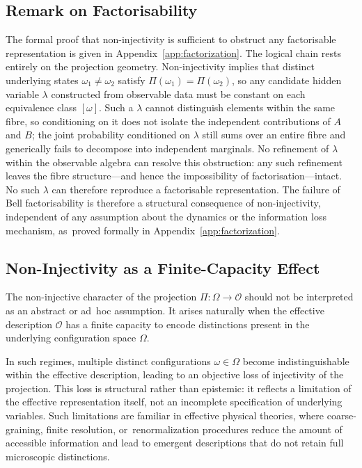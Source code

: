 \documentclass[quantumrep,article,accept,pdftex,oneauthor]{Definitions/mdpi}
\theoremstyle{remark}
\begin{document}
    \subsection{Remark on Factorisability}
      The formal proof that non-injectivity is sufficient to obstruct any
      factorisable representation is given in Appendix~\ref{app:factorization}.
      The logical chain rests entirely on the projection geometry.
      Non-injectivity implies that distinct underlying states $\omega_1 \neq \omega_2$ satisfy
      $\Pi(\omega_1) = \Pi(\omega_2)$, so any candidate hidden variable $\lambda$ constructed
      from observable data must be constant on each equivalence class $[\omega]$.
      Such a $\lambda$ cannot distinguish elements within the same fibre, so conditioning
      on it does not isolate the independent contributions of $A$ and $B$; the joint
      probability conditioned on $\lambda$ still sums over an entire fibre and generically
      fails to decompose into independent marginals.
      No refinement of $\lambda$ within the observable algebra can resolve this obstruction:
      any such refinement leaves the fibre structure---and hence the impossibility of
      factorisation---intact.
      No such $\lambda$ can therefore reproduce a factorisable representation.
      The failure of Bell factorisability is therefore a structural consequence of
      non-injectivity, independent of any assumption about the dynamics or the information
      loss mechanism, as~proved formally in Appendix~\ref{app:factorization}.

  \subsection{Non-Injectivity as a Finite-Capacity Effect}

  The non-injective character of the projection
  $\Pi : \Omega \to \mathcal{O}$ should not be interpreted as an abstract or ad~hoc assumption.
  It arises naturally when the effective description $\mathcal{O}$ has a finite
  capacity to encode distinctions present in the underlying configuration space $\Omega$.

  In such regimes, multiple distinct configurations $\omega \in \Omega$ become
  indistinguishable within the effective description, leading to an objective loss
  of injectivity of the projection.
  This loss is structural rather than epistemic: it reflects a limitation of the
  effective representation itself, not an incomplete specification of underlying variables.
  Such limitations are familiar in effective physical theories, where coarse-graining,
  finite resolution, or~renormalization procedures reduce the amount of accessible
  information and lead to emergent descriptions that do not retain full microscopic
  distinctions.
\end{document}
